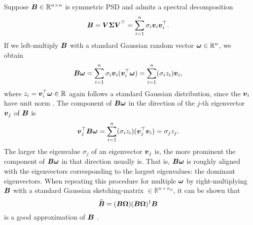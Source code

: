 Suppose $\boldsymbol{B} \in \mathbb{R}^{n \times n}$ is symmetric \gls{PSD} and admits a spectral decomposition
\begin{equation}
    \boldsymbol{B}
        = \boldsymbol{V} \boldsymbol{\Sigma} \boldsymbol{V}^{\top} 
        = \sum_{i=1}^n \sigma_i \boldsymbol{v}_i \boldsymbol{v}_i^{\top}.
    \label{equ:3-nystrom-sketching-spectral-decomposition}
\end{equation}
If we left-multiply $\boldsymbol{B}$ with a standard Gaussian random vector $\boldsymbol{\omega} \in \mathbb{R}^n$,
we obtain
\begin{equation}
    \boldsymbol{B}\boldsymbol{\omega}
        = \sum_{i=1}^n \sigma_i \boldsymbol{v}_i (\boldsymbol{v}_i^{\top} \boldsymbol{\omega})
        = \sum_{i=1}^n (\sigma_i  z_i) \boldsymbol{v}_i,
        \label{equ:3-nystrom-sketching-random-multiplication}
\end{equation}
where $z_i = \boldsymbol{v}_i^{\top} \boldsymbol{\omega} \in \mathbb{R}$ again follows a
standard Gaussian distribution, since the $\boldsymbol{v}_i$ have unit norm
\cite{klenke2013probability}. The component of $\boldsymbol{B}\boldsymbol{\omega}$ in the
direction of the $j$-th eigenvector $\boldsymbol{v}_j$ of $\boldsymbol{B}$ is
\begin{equation}
    \boldsymbol{v}_j^{\top}\boldsymbol{B}\boldsymbol{\omega}
        = \sum_{i=1}^n (\sigma_i  z_i) (\boldsymbol{v}_j^{\top} \boldsymbol{v}_i)
        = \sigma_j  z_j.
        \label{equ:3-nystrom-sketching-dominant-component}
\end{equation}
The larger the eigenvalue $\sigma_j$ of an eigenvector $\boldsymbol{v}_j$ is, the
more prominent the component of $\boldsymbol{B}\boldsymbol{\omega}$ in that direction usually is.
That is, $\boldsymbol{B}\boldsymbol{\omega}$ is roughly aligned with the eigenvectors corresponding
to the largest eigenvalues: the dominant eigenvectors.
When repeating this procedure for multiple $\boldsymbol{\omega}$ by right-multiplying $\boldsymbol{B}$
with a standard Gaussian \gls{sketching-matrix} $\in \mathbb{R}^{n \times n_{\Omega}}$,
it can be shown that
\begin{equation}
    \widehat{\boldsymbol{B}} = (\boldsymbol{B} \boldsymbol{\Omega}) (\boldsymbol{B} \boldsymbol{\Omega})^{\dagger} \boldsymbol{B}
    \label{equ:3-nystrom-RSVD}
\end{equation}
is a good approximation of $\boldsymbol{B}$ \cite{halko2011finding}.\\

